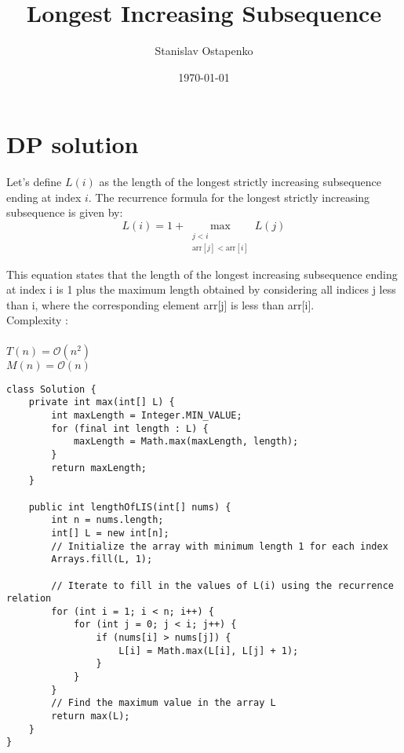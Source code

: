 \documentclass[11pt]{article}
\begin{document}
    \title{Longest Increasing Subsequence}
    \author{Stanislav Ostapenko}
    \date{\today}
    \maketitle

    \section*{DP solution}
    Let's define $L(i)$ as the length of the longest strictly increasing subsequence ending at index $i$.
    The recurrence formula for the longest strictly increasing subsequence is given by:
    \[ L(i) = 1 + \max_{\substack{j < i \\ \text{arr}[j] < \text{arr}[i]}} L(j) \]

	This equation states that the length of the longest increasing subsequence ending at index i is 1 plus the maximum length obtained by considering all indices j less than i, where the corresponding element arr[j] is less than arr[i].
\\

\noindent
Complexity :\\ 
\\
\noindent
$T(n) = \mathcal{O}(n^{2})$
\\
$M(n) = \mathcal{O}(n)$

\begin{lstlisting}
class Solution {
	private int max(int[] L) {
		int maxLength = Integer.MIN_VALUE;
		for (final int length : L) {
			maxLength = Math.max(maxLength, length);
		}
		return maxLength;
	}
	
	public int lengthOfLIS(int[] nums) {
		int n = nums.length;
		int[] L = new int[n];
		// Initialize the array with minimum length 1 for each index
		Arrays.fill(L, 1);
		
		// Iterate to fill in the values of L(i) using the recurrence relation
		for (int i = 1; i < n; i++) {
			for (int j = 0; j < i; j++) {
				if (nums[i] > nums[j]) {
					L[i] = Math.max(L[i], L[j] + 1);
				}
			}
		}
		// Find the maximum value in the array L
		return max(L);
	}
}
\end{lstlisting}
\end{document}
